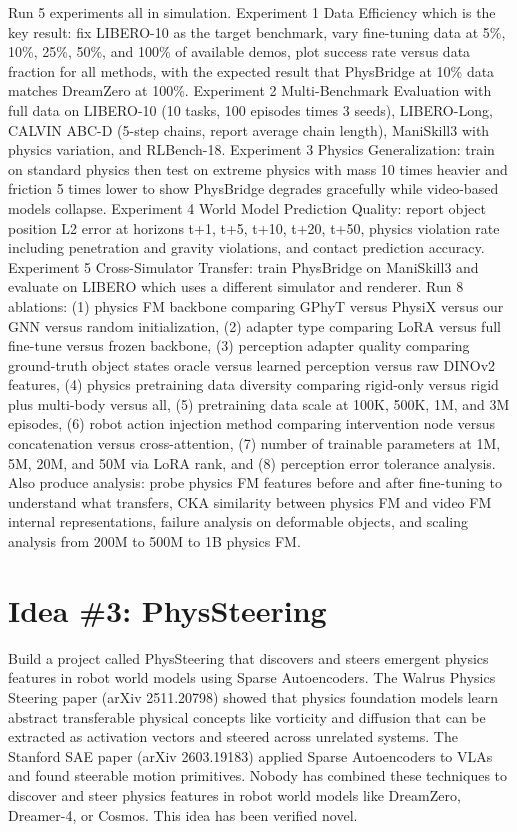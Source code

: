 \documentclass[11pt,a4paper]{article}
\begin{document}
Run 5 experiments all in simulation. Experiment 1 Data Efficiency which is the key result: fix LIBERO-10 as the target benchmark, vary fine-tuning data at 5\%, 10\%, 25\%, 50\%, and 100\% of available demos, plot success rate versus data fraction for all methods, with the expected result that PhysBridge at 10\% data matches DreamZero at 100\%. Experiment 2 Multi-Benchmark Evaluation with full data on LIBERO-10 (10 tasks, 100 episodes times 3 seeds), LIBERO-Long, CALVIN ABC-D (5-step chains, report average chain length), ManiSkill3 with physics variation, and RLBench-18. Experiment 3 Physics Generalization: train on standard physics then test on extreme physics with mass 10 times heavier and friction 5 times lower to show PhysBridge degrades gracefully while video-based models collapse. Experiment 4 World Model Prediction Quality: report object position L2 error at horizons t+1, t+5, t+10, t+20, t+50, physics violation rate including penetration and gravity violations, and contact prediction accuracy. Experiment 5 Cross-Simulator Transfer: train PhysBridge on ManiSkill3 and evaluate on LIBERO which uses a different simulator and renderer. Run 8 ablations: (1) physics FM backbone comparing GPhyT versus PhysiX versus our GNN versus random initialization, (2) adapter type comparing LoRA versus full fine-tune versus frozen backbone, (3) perception adapter quality comparing ground-truth object states oracle versus learned perception versus raw DINOv2 features, (4) physics pretraining data diversity comparing rigid-only versus rigid plus multi-body versus all, (5) pretraining data scale at 100K, 500K, 1M, and 3M episodes, (6) robot action injection method comparing intervention node versus concatenation versus cross-attention, (7) number of trainable parameters at 1M, 5M, 20M, and 50M via LoRA rank, and (8) perception error tolerance analysis. Also produce analysis: probe physics FM features before and after fine-tuning to understand what transfers, CKA similarity between physics FM and video FM internal representations, failure analysis on deformable objects, and scaling analysis from 200M to 500M to 1B physics FM.

\section{Idea \#3: PhysSteering}

Build a project called PhysSteering that discovers and steers emergent physics features in robot world models using Sparse Autoencoders. The Walrus Physics Steering paper (arXiv 2511.20798) showed that physics foundation models learn abstract transferable physical concepts like vorticity and diffusion that can be extracted as activation vectors and steered across unrelated systems. The Stanford SAE paper (arXiv 2603.19183) applied Sparse Autoencoders to VLAs and found steerable motion primitives. Nobody has combined these techniques to discover and steer physics features in robot world models like DreamZero, Dreamer-4, or Cosmos. This idea has been verified novel.
\end{document}
